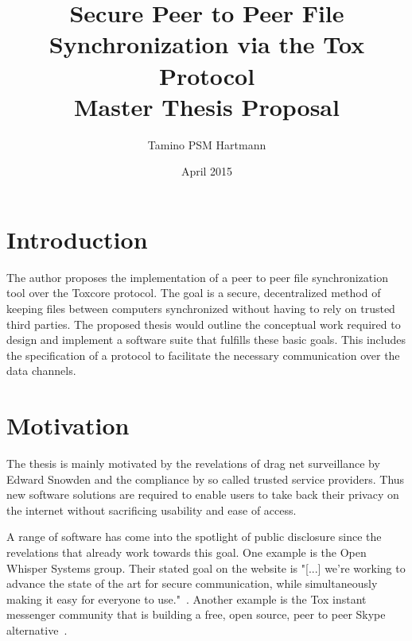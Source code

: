 \documentclass[a4paper,10pt,twoside]{article}
\begin{document}
\title{\textbf{Secure Peer to Peer File Synchronization via the Tox Protocol}\\{\Large Master Thesis Proposal}}
\author{Tamino PSM Hartmann}
\date{April 2015}
\maketitle

\setcounter{secnumdepth}{0}
\pagestyle{headings}

\section{Introduction}

The author proposes the implementation of a peer to peer file synchronization tool over the Toxcore protocol.
The goal is a secure, decentralized method of keeping files between computers synchronized without having to rely on trusted third parties.
The proposed thesis would outline the conceptual work required to design and implement a software suite that fulfills these basic goals.
This includes the specification of a protocol to facilitate the necessary communication over the data channels.

\section{Motivation}

The thesis is mainly motivated by the revelations of drag net surveillance by Edward Snowden and the compliance by so called trusted service providers.
Thus new software solutions are required to enable users to take back their privacy on the internet without sacrificing usability and ease of access.

A range of software has come into the spotlight of public disclosure since the revelations that already work towards this goal.
One example is the Open Whisper Systems group.
Their stated goal on the website is "[...] we're working to advance the state of the art for secure communication, while simultaneously making it easy for everyone to use."~\cite{web:site:whispersystems:about}.
Another example is the Tox instant messenger community that is building a free, open source, peer to peer Skype alternative~\cite{web:site:tox}.
\end{document}
